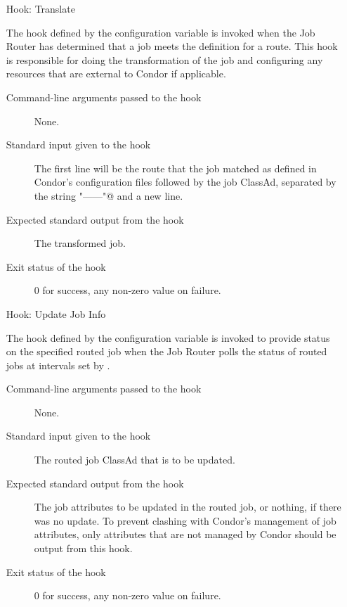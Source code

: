 \begin{itemize}
\item[Hook: Translate]

  The hook defined by the configuration variable 
  is invoked when the Job Router has determined that a job
  meets the definition for a route.  This hook is responsible for doing the
  transformation of the job and configuring any resources that are external to
  Condor if applicable.

\begin{description}
\item[Command-line arguments passed to the hook]
  None.
\item[Standard input given to the hook]
  The first line will be the route that the job matched as
  defined in Condor's configuration files followed by the job ClassAd,
  separated by the string \verb@"------"@ and a new line.
\item[Expected standard output from the hook]
  The transformed job.
\item[Exit status of the hook]
  0 for success, any non-zero value on failure.
\end{description}


\item[Hook: Update Job Info]

  The hook defined by the configuration variable 
  is invoked to provide status on the specified routed job
  when the Job Router polls the status of routed jobs at intervals
  set by .

\begin{description}
\item[Command-line arguments passed to the hook]
  None.
\item[Standard input given to the hook]
  The routed job ClassAd that is to be updated.
\item[Expected standard output from the hook]
   The job attributes to be updated in the routed job,
   or nothing, if there was no update.
   To prevent clashing with Condor's management of job attributes,
   only attributes that are not managed by Condor should be output
   from this hook.
\item[Exit status of the hook]
  0 for success, any non-zero value on failure.
\end{description}



\end{itemize}
